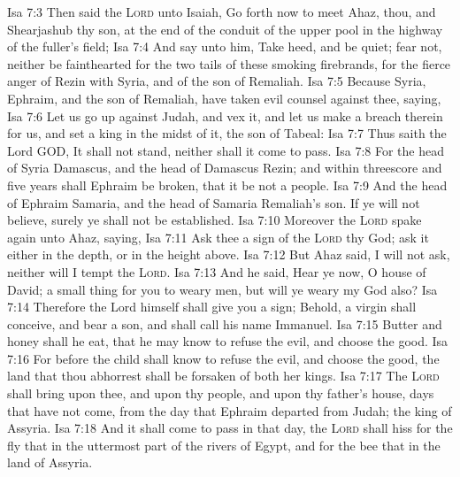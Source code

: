 \vs Isa 7:3 Then said the \textsc{Lord} unto Isaiah, Go forth now to meet Ahaz, thou, and Shearjashub thy son, at the end of the conduit of the upper pool in the highway of the fuller's field;
\vs Isa 7:4 And say unto him, Take heed, and be quiet; fear not, neither be fainthearted for the two tails of these smoking firebrands, for the fierce anger of Rezin with Syria, and of the son of Remaliah.
\vs Isa 7:5 Because Syria, Ephraim, and the son of Remaliah, have taken evil counsel against thee, saying,
\vs Isa 7:6 Let us go up against Judah, and vex it, and let us make a breach therein for us, and set a king in the midst of it,  the son of Tabeal:
\vs Isa 7:7 Thus saith the Lord GOD, It shall not stand, neither shall it come to pass.
\vs Isa 7:8 For the head of Syria  Damascus, and the head of Damascus  Rezin; and within threescore and five years shall Ephraim be broken, that it be not a people.
\vs Isa 7:9 And the head of Ephraim  Samaria, and the head of Samaria  Remaliah's son. If ye will not believe, surely ye shall not be established.
\vs Isa 7:10 Moreover the \textsc{Lord} spake again unto Ahaz, saying,
\vs Isa 7:11 Ask thee a sign of the \textsc{Lord} thy God; ask it either in the depth, or in the height above.
\vs Isa 7:12 But Ahaz said, I will not ask, neither will I tempt the \textsc{Lord}.
\vs Isa 7:13 And he said, Hear ye now, O house of David;  a small thing for you to weary men, but will ye weary my God also?
\vs Isa 7:14 Therefore the Lord himself shall give you a sign; Behold, a virgin shall conceive, and bear a son, and shall call his name Immanuel.
\vs Isa 7:15 Butter and honey shall he eat, that he may know to refuse the evil, and choose the good.
\vs Isa 7:16 For before the child shall know to refuse the evil, and choose the good, the land that thou abhorrest shall be forsaken of both her kings.
\vs Isa 7:17 The \textsc{Lord} shall bring upon thee, and upon thy people, and upon thy father's house, days that have not come, from the day that Ephraim departed from Judah;  the king of Assyria.
\vs Isa 7:18 And it shall come to pass in that day,  the \textsc{Lord} shall hiss for the fly that  in the uttermost part of the rivers of Egypt, and for the bee that  in the land of Assyria.
